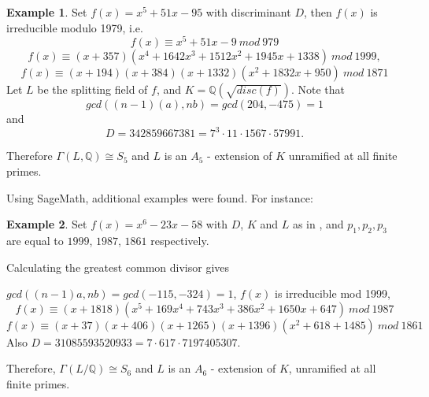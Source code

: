 \documentclass[12pt]{extarticle}
\newcommand{\Q}{\mathbb{Q}}
\newcommand{\<}{\langle}
\renewcommand{\>}{\rangle}
\theoremstyle{definition}
\newtheorem{example}{Example}
\begin{document}
\begin{example}
\label{ex:trinomials}
Set $f(x)= x^5+51x-95$ with discriminant $D$, then $f(x)$ is irreducible modulo 1979, i.e. 
\begin{equation}
f(x)\equiv x^5+51x-9 \: mod  \: 979
\end{equation}
\begin{equation}
f(x) \equiv(x + 357)(x^4 + 1642x^3 + 1512 x^2 + 1945x + 1338) \:mod\: 1999,
\end{equation}
\begin{equation}
f(x) \equiv(
x + 194)(x + 384)(x + 1332)(x^2 + 1832x + 950)\:mod\:1871
\end{equation}
 Let $L$ be the splitting field of $f$, and $K = \Q\left(\sqrt{disc(f)}\right)$. 
Note that 
\begin{equation}
gcd((n-1)(a),nb) = gcd(204,-475)=1
\end{equation}
 and 
\begin{equation}
D = 342859667381 = 7^3 \cdot 11 \cdot 1567 \cdot 57991.
\end{equation} 

Therefore $\Gamma(L,\Q) \cong S_5$ and $L$ is an $A_5$ - extension of $K$ unramified at all finite primes.
\end{example}

Using SageMath, additional examples were found. For instance: 
\begin{example}
Set $f(x)= x^6-23x-58$ with $D$, $K$ and $L$ as in , and $p_1,p_2,p_3$ are equal to $1999$, $1987$, $1861$ respectively. \par
Calculating the greatest common divisor gives 

$gcd((n-1)a,nb) = gcd(-115,-324)=1$, $f(x)$ is irreducible mod 1999,
\begin{equation}
f(x) \equiv(x + 1818)(x^5 + 169x^4 + 743x^3+386x^2+1650x+647)\: mod \:1987
\end{equation}
\begin{equation}
f(x) \equiv(x + 37)(x + 406)(x + 1265)(x+1396)(x^2 + 618 + 1485)\:mod\:1861
\end{equation}
 Also $D = 31085593520933 = 7 \cdot 617 \cdot 7197405307$. 

 Therefore, $\Gamma(L/\Q) \cong S_6$ and $L$ is an $A_6$ - extension of $K$, unramified at all finite primes.
\end{example}
\end{document}

